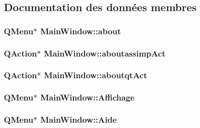 \subsection{Documentation des données membres}
\hypertarget{class_main_window_ab3854d1b008ad18b7d392b767202c802}{
\subsubsection[{about}]{\setlength{\rightskip}{0pt plus 5cm}Q\+Menu$\ast$ Main\+Window\+::about\hspace{0.3cm}{\ttfamily [private]}}}\label{class_main_window_ab3854d1b008ad18b7d392b767202c802}
\hypertarget{class_main_window_afb5ca498bd0c6b89552843980174becd}{
\subsubsection[{aboutassimp\+Act}]{\setlength{\rightskip}{0pt plus 5cm}Q\+Action$\ast$ Main\+Window\+::aboutassimp\+Act\hspace{0.3cm}{\ttfamily [private]}}}\label{class_main_window_afb5ca498bd0c6b89552843980174becd}
\hypertarget{class_main_window_aa6c9616af83a5c7fa1bcf44204ffb96f}{
\subsubsection[{aboutqt\+Act}]{\setlength{\rightskip}{0pt plus 5cm}Q\+Action$\ast$ Main\+Window\+::aboutqt\+Act\hspace{0.3cm}{\ttfamily [private]}}}\label{class_main_window_aa6c9616af83a5c7fa1bcf44204ffb96f}
\hypertarget{class_main_window_a77f24d5ff1220ea72f7730d20672911c}{
\subsubsection[{Affichage}]{\setlength{\rightskip}{0pt plus 5cm}Q\+Menu$\ast$ Main\+Window\+::\+Affichage\hspace{0.3cm}{\ttfamily [private]}}}\label{class_main_window_a77f24d5ff1220ea72f7730d20672911c}
\hypertarget{class_main_window_ab9d17ad44a1ac962e46ac4af1a5732a0}{
\subsubsection[{Aide}]{\setlength{\rightskip}{0pt plus 5cm}Q\+Menu$\ast$ Main\+Window\+::\+Aide\hspace{0.3cm}{\ttfamily [private]}}}\label{class_main_window_ab9d17ad44a1ac962e46ac4af1a5732a0}
